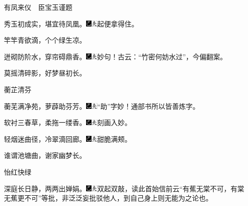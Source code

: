 有凤来仪　臣宝玉谨题

秀玉初成实，堪宜待凤凰。{\includegraphics[width=3mm]{../Images/00003}\includegraphics[width=3mm]{../Images/00012}\footnotesize \kaishu 起便拿得住。}

竿竿青欲滴，个个绿生凉。

迸砌防阶水，穿帘碍鼎香。{\includegraphics[width=3mm]{../Images/00003}\includegraphics[width=3mm]{../Images/00012}\footnotesize \kaishu 妙句！古云：``竹密何妨水过''，今偏翻案。}

莫摇清碎影，好梦昼初长。

蘅芷清芬

蘅芜满净苑，萝薜助芬芳。{\includegraphics[width=3mm]{../Images/00003}\includegraphics[width=3mm]{../Images/00012}\footnotesize \kaishu ``助''字妙！通部书所以皆善炼字。}

软衬三春草，柔拖一缕香。{\includegraphics[width=3mm]{../Images/00003}\includegraphics[width=3mm]{../Images/00012}\footnotesize \kaishu 刻画入妙。}

轻烟迷曲径，冷翠滴回廊。{\includegraphics[width=3mm]{../Images/00003}\includegraphics[width=3mm]{../Images/00012}\footnotesize \kaishu 甜脆满颊。}

谁谓池塘曲，谢家幽梦长。

怡红快绿

深庭长日静，两两出婵娟。{\includegraphics[width=3mm]{../Images/00003}\includegraphics[width=3mm]{../Images/00012}\footnotesize \kaishu 双起双敲，读此首始信前云``有蕉无棠不可，有棠无蕉更不可''等批，非泛泛妄批驳他人，到自己身上则无能为之论也。}

